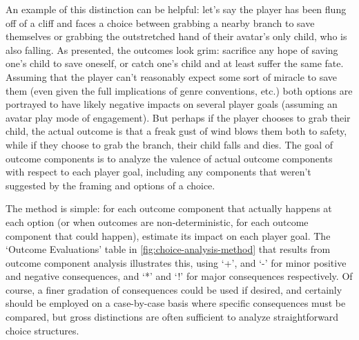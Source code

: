 An example of this distinction can be helpful: let's say the player has been flung off of a cliff and faces a choice between grabbing a nearby branch to save themselves or grabbing the outstretched hand of their avatar's only child, who is also falling.
%
As presented, the outcomes look grim: sacrifice any hope of saving one's child to save oneself, or catch one's child and at least suffer the same fate.
%
Assuming that the player can't reasonably expect some sort of miracle to save them (even given the full implications of genre conventions, etc.) both options are portrayed to have likely negative impacts on several player goals (assuming an avatar play mode of engagement).
%
But perhaps if the player chooses to grab their child, the actual outcome is that a freak gust of wind blows them both to safety, while if they choose to grab the branch, their child falls and dies.
%
The goal of outcome components is to analyze the valence of actual outcome components with respect to each player goal, including any components that weren't suggested by the framing and options of a choice.


The method is simple: for each outcome component that actually happens at each option (or when outcomes are non-deterministic, for each outcome component that could happen), estimate its impact on each player goal.
%
The `Outcome Evaluations' table in \cref{fig:choice-analysis-method} that results from outcome component analysis illustrates this, using `+', and `-' for minor positive and negative consequences, and `*' and `!' for major consequences respectively.
%
Of course, a finer gradation of consequences could be used if desired, and certainly should be employed on a case-by-case basis where specific consequences must be compared, but gross distinctions are often sufficient to analyze straightforward choice structures.


